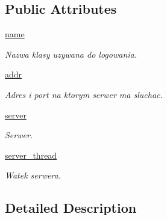 \subsection*{Public Attributes}
\begin{CompactItemize}
\item 
\hypertarget{class_serv_1_1_u_d_p_server_1_1_u_d_p_server_092c452f84b153880539e7f9968fd4a1}{
\hyperlink{class_serv_1_1_u_d_p_server_1_1_u_d_p_server_092c452f84b153880539e7f9968fd4a1}{name}}
\label{class_serv_1_1_u_d_p_server_1_1_u_d_p_server_092c452f84b153880539e7f9968fd4a1}

\begin{CompactList}\small\item\em Nazwa klasy uzywana do logowania. \item\end{CompactList}\item 
\hyperlink{class_serv_1_1_u_d_p_server_1_1_u_d_p_server_19f6bc70abc4eb1d1c0806a9364d1fbe}{addr}
\begin{CompactList}\small\item\em Adres i port na ktorym serwer ma sluchac. \item\end{CompactList}\item 
\hypertarget{class_serv_1_1_u_d_p_server_1_1_u_d_p_server_61a94c838a7067f18e9e1ac122aa2397}{
\hyperlink{class_serv_1_1_u_d_p_server_1_1_u_d_p_server_61a94c838a7067f18e9e1ac122aa2397}{server}}
\label{class_serv_1_1_u_d_p_server_1_1_u_d_p_server_61a94c838a7067f18e9e1ac122aa2397}

\begin{CompactList}\small\item\em Serwer. \item\end{CompactList}\item 
\hypertarget{class_serv_1_1_u_d_p_server_1_1_u_d_p_server_f86ce8e66ef2b3dfd537260e2a0e6fc9}{
\hyperlink{class_serv_1_1_u_d_p_server_1_1_u_d_p_server_f86ce8e66ef2b3dfd537260e2a0e6fc9}{server\_\-thread}}
\label{class_serv_1_1_u_d_p_server_1_1_u_d_p_server_f86ce8e66ef2b3dfd537260e2a0e6fc9}

\begin{CompactList}\small\item\em Watek serwera. \item\end{CompactList}\end{CompactItemize}


\subsection{Detailed Description}


